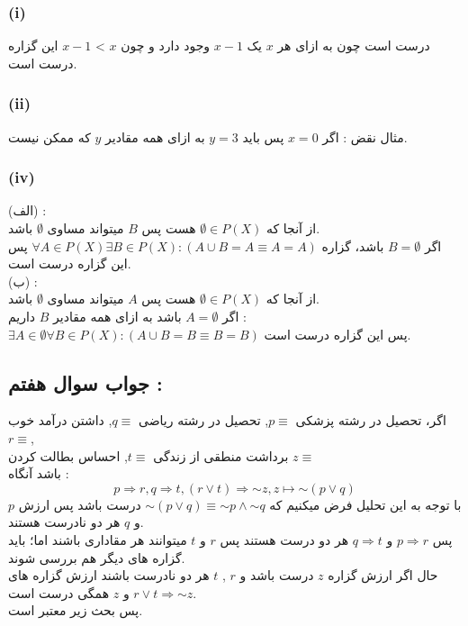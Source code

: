 \documentclass{article}
\newcommand{\tildevar}{\mathord{\sim}}
\begin{document}
			\subsubsection*{(i)}
				درست است چون به ازای هر $x$ یک $x - 1$ وجود دارد و چون $x$ > $x - 1$  این گزاره درست است.
			
			\subsubsection*{(ii)}
				مثال نقض :
				اگر $x = 0$ پس باید $y = 3$ به ازای همه مقادیر $y$ که ممکن نیست.
			
			\subsubsection*{(iv)}
				(الف) :\\
				از آنجا که $\emptyset \in P(X)$ هست پس $B$ میتواند مساوی $\emptyset$ باشد.\\
				اگر $B = \emptyset$ باشد، گزاره $\forall A \in P(X) \exists  B \in P(X): (A \cup B = A \equiv A = A)$ پس این گزاره درست است. \\

				(ب) :\\
				از آنجا که $\emptyset \in P(X)$ هست پس $A$ میتواند مساوی $\emptyset$ باشد.\\
				اگر $A = \emptyset$ باشد به ازای همه مقادیر $B$ داریم :\\
				$\exists A \in \emptyset \forall B \in P(X): (A \cup B = B \equiv B = B)$ پس این گزاره درست است.

		\subsection*{جواب سوال هفتم :}
			اگر، تحصیل در رشته پزشکی $p \equiv $, تحصیل در رشته ریاضی $q \equiv$, داشتن درآمد خوب $r \equiv $,\\
			برداشت منطقی از زندگی $t \equiv $, احساس بطالت کردن $z \equiv $\\ باشد آنگاه :
			\[ p \Rightarrow r , q \Rightarrow t , (r \lor t) \Rightarrow \tildevar z, z \mapsto \tildevar (p \lor q) \]
			با توجه به این تحلیل فرض میکنیم که $\tildevar (p \lor q) \equiv \tildevar p \land \tildevar q$ درست باشد پس ارزش $p$و $q$ هر دو نادرست هستند. \\
			پس $p \Rightarrow r$ و $q \Rightarrow t$ هر دو درست هستند پس $r$ و $t$ میتوانند هر مقاداری باشند اما؛ باید گزاره های دیگر هم بررسی شوند. \\
			حال اگر ارزش گزاره $z$ درست باشد و $r$ , $t$ هر دو نادرست باشند ارزش گزاره های $r \lor t \Rightarrow \tildevar z$ و $z$ همگی درست است.\\
			پس بحث زیر معتبر است.
		
\end{document}
